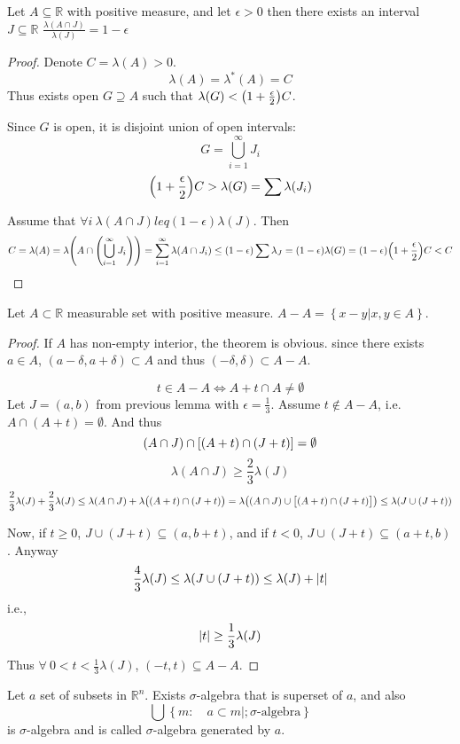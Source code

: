 \begin{lemma}
	Let $A\subseteq \mathbb{R}$ with positive measure, and let $\epsilon>0$ then there exists an interval $J\subseteq \mathbb{R}$ $\frac{\lambda(A\cap J)}{\lambda(J)} = 1-\epsilon$
	\begin{proof}
		Denote $C=\lambda(A)>0$.
		$$\lambda(A) = \lambda^*(A) = C$$
		Thus exists open $G\supseteq A$ such that $\lambda(G) < \qty(1+ \frac{\epsilon}{2})C$.
		
		Since $G$ is open, it is disjoint union of open intervals:
		$$G = \bigcup_{i=1}^\infty J_i$$
		$$\qty(1+ \frac{\epsilon}{2})C > \lambda(G) = \sum \lambda(J_i)$$
		
		Assume that $\forall i \: \lambda(A\cap J) leq (1-\epsilon) \lambda(J)$. Then
		$$C = \lambda(A) = \lambda\qty(A \cap \qty(\bigcup_{i=1}^\infty J_i)) = \sum_{i=1}^\infty \lambda(A\cap J_i) \leq (1-\epsilon) \sum \lambda_J = (1-\epsilon)\lambda(G) = (1-\epsilon)\qty(1+\frac{\epsilon}{2})C < C$$
	\end{proof}
\end{lemma}

\begin{theorem}
	Let $A\subset \mathbb{R}$ measurable set with positive measure.
	$A-A = \left\{ x-y|x,y\in A \right\}$.
	
	\begin{proof}
		If $A$ has non-empty interior, the theorem is obvious. since there exists $a\in A$, $(a-\delta, a+\delta) \subset A$ and thus $(-\delta, \delta) \subset A-A$.
		
		$$t\in A-A \iff A+t\cap A \neq \emptyset$$
		Let $J=(a,b)$ from previous lemma with $\epsilon =\frac{1}{3}$. Assume $t\notin A-A$, i.e. $A\cap(A+t) =\emptyset$. And thus
		$$(A\cap J) \cap \qty[(A+t) \cap (J+t)] = \emptyset$$
		$$\lambda(A\cap J) \geq \frac{2}{3} \lambda(J)$$
		$$\frac{2}{3}\lambda(J) + \frac{2}{3}\lambda(J) \leq \lambda(A\cap J) + \lambda\qty\big((A+t) \cap (J+t)) =\lambda\qty((A\cap J) \cup \qty\big[(A+t) \cap (J+t)]) \leq \lambda(J \cup (J+t))$$
		
		Now, if $t\geq 0$, $J \cup (J+t) \subseteq (a,b+t)$, and if $t<0$, $J \cup (J+t) \subseteq (a+t,b)$. Anyway
		$$\frac{4}{3}\lambda(J) \leq \lambda(J \cup (J+t)) \leq \lambda(J) + \abs{t} $$
		i.e.,
		$$\abs{t} \geq \frac{1}{3}\lambda(J)$$
		Thus $\forall\: 0<t < \frac{1}{3}\lambda(J)$, $(-t,t)\subseteq A-A$.
	\end{proof}
\end{theorem}

Let $a$ set of subsets in $\mathbb{R}^n$. Exists $\sigma$-algebra that is superset of $a$, and also
$$\bigcup \left\{ m: \quad a\subset m  |; \sigma\text{-algebra} \right\}$$
is $\sigma$-algebra and is called $\sigma$-algebra  generated by $a$.

